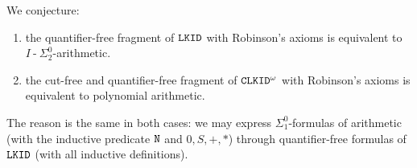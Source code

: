 \documentclass[a4paper,12pt]{article}
\newcommand{\Nat}               { {\tt N}  }
\newcommand{\hy}        { {\operatorname{-}}}
\newcommand{\LKID} { {\tt LKID} }
\newcommand{\CLKID} { {\tt CLKID} }
\begin{document}
We conjecture:
\begin{enumerate}
\item
the quantifier-free fragment of $\LKID$ with Robinson's axioms is equivalent to $I \hy \Sigma^0_2$-arithmetic. 
\item
the cut-free and quantifier-free fragment of $\CLKID^\omega$ with Robinson's axioms is equivalent to polynomial arithmetic.
\end{enumerate}
The reason is the same in both cases: we may express $\Sigma^0_1$-formulas of arithmetic (with the inductive predicate $\Nat$ and $0,S,+,*$) through quantifier-free formulas of $\LKID$ (with all inductive definitions). 


%
%
%
%
%
%
%
%
%
\end{document}
